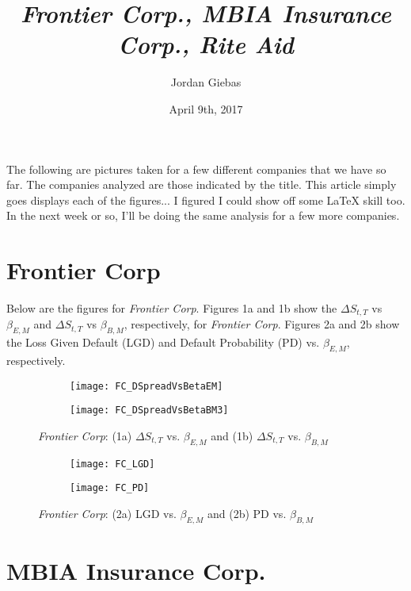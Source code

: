 \documentclass[12pt, two-sided]{article}
\title{\emph{Frontier Corp., MBIA Insurance Corp., Rite Aid}}
\author{Jordan Giebas}
\date{April 9th, 2017}
\begin{document}
 
\maketitle

The following are pictures taken for a few different companies that we have so far. The companies analyzed are those indicated by the title. This article  simply goes displays each of the figures... I figured I could show off some LaTeX skill too. In the next week or so, I'll be doing the same analysis for a few more companies.

\section{Frontier Corp}

Below are the figures for \emph{Frontier Corp}. Figures 1a and 1b show the $\Delta S_{t,T}$ vs $\beta_{E,M}$ and $\Delta S_{t,T}$ vs $\beta_{B,M}$, respectively, for \emph{Frontier Corp}. Figures 2a and 2b show the Loss Given Default (LGD) and Default Probability (PD) vs. $\beta_{E,M}$, respectively. 

\begin{figure}[H]
\begin{subfigure}{0.5\textwidth}
  \centering
  \texttt{[image: FC\_DSpreadVsBetaEM]}
  \caption{}
\end{subfigure}%
\begin{subfigure}{.5\textwidth}
  \centering
  \texttt{[image: FC\_DSpreadVsBetaBM3]}
  \caption{}
\end{subfigure}
\caption{\emph{Frontier Corp}: (1a)  $\Delta S_{t,T}$ vs. $\beta_{E,M}$
			  and (1b)  $\Delta S_{t,T}$ vs. $\beta_{B,M}$}
\end{figure}

\begin{figure}[H]
\begin{subfigure}{0.5\textwidth}
  \centering
  \texttt{[image: FC\_LGD]}
  \caption{}
  \end{subfigure}%
\begin{subfigure}{.5\textwidth}
  \centering
  \texttt{[image: FC\_PD]}
  \caption{}
\end{subfigure}
\caption{\emph{Frontier Corp}: (2a)  LGD vs. $\beta_{E,M}$
			  and (2b) PD vs. $\beta_{B,M}$}
\end{figure}

\section{MBIA Insurance Corp.}
\end{document}
